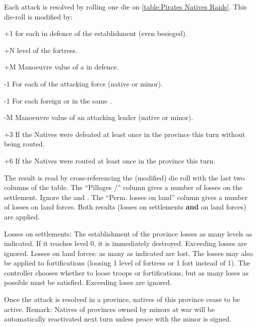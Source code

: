 \bparag Each attack is resolved by rolling one die on \ref{table:Pirates
  Natives Raids}. This die-roll is modified by:
\begin{modlist}
\item[+1] for each \LD in defence of the establishment (even besieged).
\item[+N] level of the fortress.
\item[+M] Manoeuvre value of a  in defence.
\item[-1] For each \LD of the attacking force (native or \ROTW minor).
\item[-1] For each foreign \COL or \TP in the same \Area.
\item[-M] Manoeuvre value of an attacking leader (native or \ROTW minor).
\item[+3] If the Natives were defeated at least once in the province this turn
  without being routed.
\item[+6]If the Natives were routed at least once in the province this turn.
\end{modlist}

\bparag The result is read by cross-referencing the (modified) die roll with
the last two columns of the table.
\bparag The ``Pillages \TP/\COL'' column gives a number of losses on the
settlement. Ignore the \textddag\xspace and \textdag.
\bparag The ``Perm. losses on land'' column gives a number of losses on land
forces.
\bparag Both results (losses on settlements \textbf{and} on land forces) are
applied.

\bparag Losses on settlements: The establishment of the province losses as
many levels as indicated. If it reaches level 0, it is immediately
destroyed. Exceeding losses are ignored.
\bparag Losses on land forces: as many \LD as indicated are lost. The losses
may also be applied to fortifications (loosing 1 level of fortress or 1 fort
instead of 1\LD). The controller chooses whether to loose troops or
fortifications, but as many loses as possible must be satisfied. Exceeding
loses are ignored.

\bparag Once the attack is resolved in a province, natives of this province
cease to be active.
\bparag Remark: Natives of provinces owned by \ROTW minors at war will be
automatically reactivated next turn unless peace with the minor is signed.

